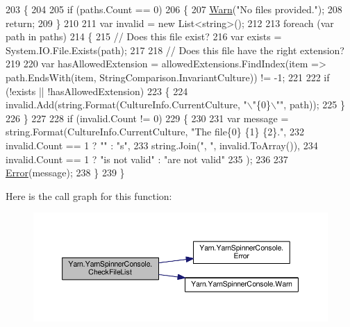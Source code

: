 \begin{DoxyCode}
203         \{
204 
205             \textcolor{keywordflow}{if} (paths.Count == 0)
206             \{
207                 \hyperlink{a00174_a979bb6f049b6c5294f745a19e24ddd9d}{Warn}(\textcolor{stringliteral}{"No files provided."});
208                 \textcolor{keywordflow}{return};
209             \}
210 
211             var invalid = \textcolor{keyword}{new} List<string>();
212 
213             \textcolor{keywordflow}{foreach} (var path \textcolor{keywordflow}{in} paths)
214             \{
215                 \textcolor{comment}{// Does this file exist?}
216                 var exists = System.IO.File.Exists(path);
217 
218                 \textcolor{comment}{// Does this file have the right extension?}
219 
220                 var hasAllowedExtension = allowedExtensions.FindIndex(item => path.EndsWith(item, 
      StringComparison.InvariantCulture)) != -1;
221 
222                 \textcolor{keywordflow}{if} (!exists || !hasAllowedExtension)
223                 \{
224                     invalid.Add(string.Format(CultureInfo.CurrentCulture, \textcolor{stringliteral}{"\(\backslash\)"\{0\}\(\backslash\)""}, path));
225                 \}
226             \}
227 
228             \textcolor{keywordflow}{if} (invalid.Count != 0)
229             \{
230 
231                 var message = string.Format(CultureInfo.CurrentCulture, \textcolor{stringliteral}{"The file\{0\} \{1\} \{2\}."},
232                     invalid.Count == 1 ? \textcolor{stringliteral}{""} : \textcolor{stringliteral}{"s"},
233                                             string.Join(\textcolor{stringliteral}{", "}, invalid.ToArray()),
234                     invalid.Count == 1 ? \textcolor{stringliteral}{"is not valid"} : \textcolor{stringliteral}{"are not valid"}
235                 );
236 
237                 \hyperlink{a00174_a2f63f9f5b7634cb50ee75ff2eb18b137}{Error}(message);
238             \}
239         \}
\end{DoxyCode}


Here is the call graph for this function\-:
\nopagebreak
\begin{figure}[H]
\begin{center}
\leavevmode
\includegraphics[width=350pt]{a00174_ad77564b25725a771f0fd4da430582e6f_cgraph}
\end{center}
\end{figure}




